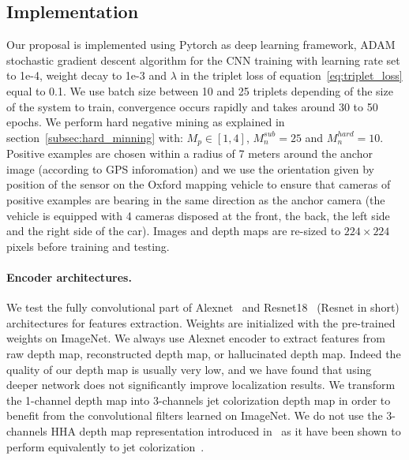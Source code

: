 \subsection{Implementation}
\label{subsec:implementation}

Our proposal is implemented using Pytorch as deep learning framework, ADAM stochastic gradient descent algorithm for the CNN training with learning rate set to 1e-4, weight decay to 1e-3 and $\lambda$ in the triplet loss of equation~\ref{eq:triplet_loss} equal to 0.1. We use batch size between 10 and 25 triplets depending of the size of the system to train, convergence occurs rapidly and takes around 30 to 50 epochs. We perform hard negative mining as explained in section~\ref{subsec:hard_minning} with: $M_p \in [1, 4]$, $M_n^{sub} = 25$ and $M_n^{hard} = 10$. Positive examples are chosen within a radius of 7 meters around the anchor image  (according to GPS inforomation) and we use the orientation given by position of the sensor on the Oxford mapping vehicle to ensure that cameras of positive examples are bearing in the same direction as the anchor camera (the vehicle is equipped with 4 cameras disposed at the front, the back, the left side and the right side of the car). Images and depth maps are re-sized to $224\times224$ pixels before training and testing.

\paragraph{Encoder architectures.}
We test the fully convolutional part of Alexnet~\citep{Krizhevsky2012} and Resnet18~\citep{he2016deep} (Resnet in short) architectures for features extraction. Weights are initialized with the pre-trained weights on ImageNet. We always use Alexnet encoder to extract features from raw depth map, reconstructed depth map, or hallucinated depth map. Indeed the quality of our depth map is usually very low, and we have found that using deeper network does not significantly improve localization results. We transform the 1-channel depth map into 3-channels jet colorization depth map in order to benefit from the convolutional filters learned on ImageNet. We do not use the 3-channels HHA depth map representation introduced in~\cite{Gupta2014} as it have been shown to perform equivalently to jet colorization~\cite{Eitel2015}.

